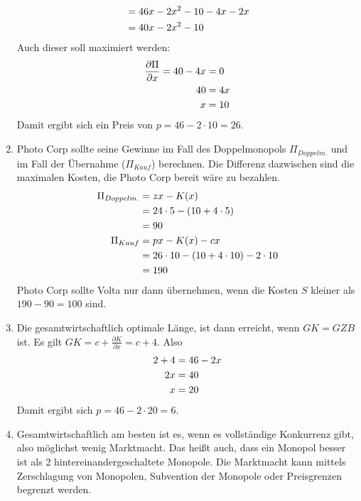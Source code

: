 \documentclass{article}
\begin{document}
\begin{enumerate}[label=(\alph*)]
\begin{align}
			&= 46x-2x^2-10-4x - 2x \notag \\
			&= 40x-2x^2-10 \notag
		\end{align}
		Auch dieser soll maximiert werden:
		\begin{align}
			\frac{\partial\Pi}{\partial x} = 40-4x&=0 \notag \\
			40 &= 4x \notag \\
			x &= 10 \notag
		\end{align}
		Damit ergibt sich ein Preis von $p=46-2\cdot 10= 26$.
		\item Photo Corp sollte seine Gewinne im Fall des Doppelmonopols $\Pi_{Doppelm.}$ und im Fall der Übernahme ($\Pi_{Kauf}$) berechnen. Die Differenz dazwischen sind die maximalen Kosten, die Photo Corp bereit wäre zu bezahlen.
		\begin{align}
			\Pi_{Doppelm.} &= zx - K(x) \notag \\
			&= 24\cdot 5 - (10+4\cdot 5) \notag \\
			&= 90 \notag \\
			\Pi_{Kauf} &= px - K(x) - cx \notag \\
			&= 26\cdot 10 - (10+4\cdot 10) - 2\cdot 10 \notag \\
			&= 190 \notag
		\end{align}
		Photo Corp sollte Volta nur dann übernehmen, wenn die Kosten $S$ kleiner als $190-90=100$ sind.
		\item Die gesamtwirtschaftlich optimale Länge, ist dann erreicht, wenn $GK=GZB$ ist. Es gilt $GK = c + \frac{\partial K}{\partial x} = c + 4$. Also
		\begin{align}
			2+4 &= 46-2x \notag \\
			2x &= 40 \notag \\
			x &= 20 \notag
		\end{align}
		Damit ergibt sich $p=46-2\cdot 20=6$.
		\item Gesamtwirtschaftlich am besten ist es, wenn es vollständige Konkurrenz gibt, also möglichst wenig Marktmacht. Das heißt auch, dass ein Monopol besser ist als 2 hintereinandergeschaltete Monopole. Die Marktmacht kann mittels Zerschlagung von Monopolen, Subvention der Monopole oder Preisgrenzen begrenzt werden.
	\end{enumerate}
\end{document}
